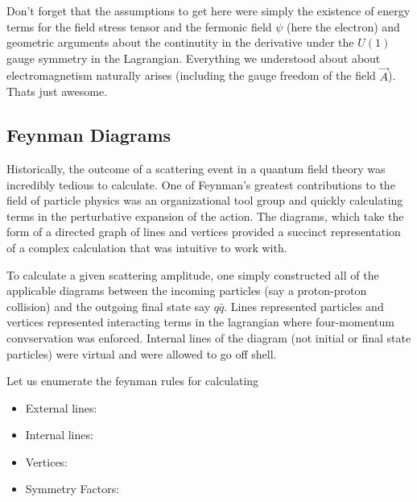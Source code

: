 Don't forget that the assumptions to get here were simply the existence of energy terms for the field stress tensor 
and the fermonic field $\psi$ (here the electron) and geometric arguments about the continutity in the derivative 
under the $U(1)$ gauge symmetry in the Lagrangian. Everything we understood about about electromagnetism naturally 
arises (including the gauge freedom of the field $\vec A$). Thats just awesome. 

\subsection{Feynman Diagrams}

Historically, the outcome of a scattering event in a quantum field theory was incredibly tedious to calculate. One of Feynman's greatest contributions to the field of particle physics was an organizational tool group and quickly calculating terms in the perturbative expansion of the action. The diagrams, which take the form of a directed
graph of lines and vertices  provided a succinct representation of a complex calculation that was intuitive to work with. 

To calculate a given scattering amplitude, one simply constructed all of the applicable diagrams between
the incoming particles (say a proton-proton collision) and the outgoing final state say $q\bar{q}$. Lines  represented particles and vertices represented
interacting terms in the lagrangian where four-momentum convservation was enforced. Internal lines of the diagram (not initial or final state particles) 
were virtual and were allowed to go off shell. 

Let us enumerate the feynman rules for calculating 

\begin{itemize}
\item External lines:
\item Internal lines:
\item Vertices: 
\item Symmetry Factors: 
\end{itemize}

